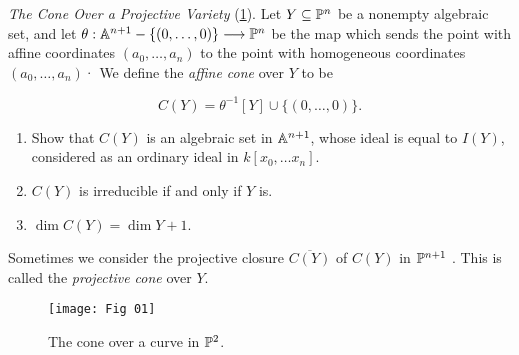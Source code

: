 \label{1.2.10}

\textit{The Cone Over a Projective Variety} (\ref{fig1.2.3}). Let $Y \subseteq \P^n$ be a nonempty algebraic set, and let $\theta :\A^{n + 1} -
\{(0, \dots ,0)\} \longrightarrow \P^n$ be the map which sends the point with affine coordinates $(a_0, \dots, a_n)$ to the point with homogeneous coordinates $(a_0 , \dots ,a_n)$· We define the \textit{affine cone} over $Y$ to be

\[
    C(Y) = \theta^{- 1}[Y] \cup \{(0, \dots ,0)\}.
\]

\begin{enumerate}[label = (\alph*)]
    \item Show that $C(Y)$ is an algebraic set in $\A^{n + 1}$, whose ideal is equal to $I(Y)$, considered as an ordinary ideal in $k[x_0 , \dots x_n]$.
    
    \item $C(Y)$ is irreducible if and only if $Y$ is.
    
    \item $\dim C(Y) = \dim Y + 1$.
\end{enumerate}

Sometimes we consider the projective closure $\overline{C(Y)}$ of $C(Y)$ in $\P^{n + 1}$ . This is called the \textit{projective cone} over $Y$.


\begin{figure}
    \centering
    \texttt{[image: Fig 01]}
    \caption{The cone over a curve in $\P^2$.}
    \label{fig1.2.3}
\end{figure}

